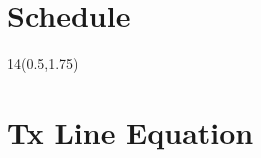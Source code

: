 

\section{Schedule}
\renewcommand{\arraystretch}{1}
\begin{frame}{}
	\begin{textblock}{14}(0.5,1.75)
	\def\myfontsize{footnotesize}
	
	\end{textblock}
\end{frame}







\section{Tx Line Equation}

